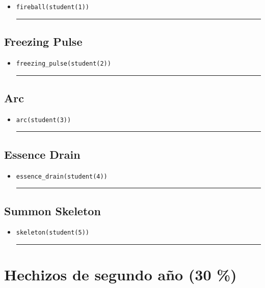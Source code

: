 \documentclass[11pt, onside]{article}
\newcommand{\matlab}[1]{\lstinline[style=Matlab-editor]!#1!}
\newcommand{\shortresponserule}{{\large\rule{5 cm}{0.3mm}}}
\begin{document}


\begin{itemize}
    \item \matlab{fireball(student(1))} \hfill \shortresponserule
\end{itemize}

\subsection{Freezing Pulse}



\begin{itemize}
    \item \matlab{freezing_pulse(student(2))} \hfill \shortresponserule
\end{itemize}

\subsection{Arc}


\begin{itemize}
    \item \matlab{arc(student(3))} \hfill \shortresponserule
\end{itemize}

\subsection{Essence Drain}


\begin{itemize}
    \item \matlab{essence_drain(student(4))} \hfill \shortresponserule
\end{itemize}

\subsection{Summon Skeleton}


\begin{itemize}
    \item \matlab{skeleton(student(5))} \hfill \shortresponserule
\end{itemize}

\pagebreak

\section{Hechizos de segundo año (30 \%)}
\end{document}
